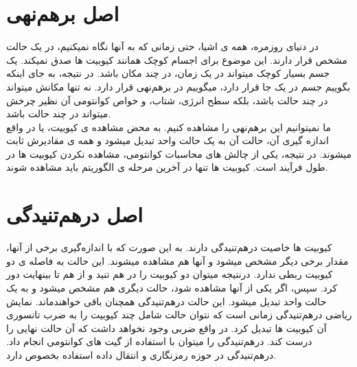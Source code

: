 \section{اصل برهم‌نهی}
در دنیای روزمره، همه ی اشیا، حتی زمانی که به آنها نگاه نمیکنیم، در یک حالت مشخص قرار دارند. این موضوع برای اجسام کوچک همانند کیوبیت ها صدق نمیکند. یک جسم بسیار کوچک میتواند در یک زمان، در چند مکان باشد. در نتیجه، به جای اینکه بگوییم جسم در یک جا قرار دارد، میگوییم در برهم‌نهی قرار دارد. نه تنها مکانش میتواند در چند حالت باشد، بلکه سطح انرژی، شتاب، و خواص کوانتومی آن نظیر چرخش
 میتواند در چند حالت باشد. 
\\
ما نمیتوانیم این برهم‌نهی را مشاهده کنیم. به محض مشاهده ی کیوبیت، یا در واقع اندازه گیری آن، حالت آن به یک حالت واحد تبدیل میشود و همه ی مقادیرش ثابت میشوند. در نتیجه، یکی از چالش های محاسبات کوانتومی، مشاهده نکردن کیوبیت ها در طول فرآیند است. کیوبیت ها تنها در آخرین مرحله ی الگوریتم باید مشاهده شوند.
\cite{cambridgebook}
\section{اصل درهم‌تنیدگی}
کیوبیت ها خاصیت درهم‌تنیدگی
دارند. به این صورت که با اندازه‌گیری برخی از آنها، مقدار برخی دیگر مشخص میشود و آنها هم مشاهده میشوند. این حالت به فاصله ی دو کیوبیت ربطی ندارد. درنتیجه میتوان دو کیوبیت را در هم تنید و از هم تا بینهایت دور کرد. سپس، اگر یکی از آنها مشاهده شود، حالت دیگری هم مشخص میشود و به یک حالت واحد تبدیل میشود. این حالت درهم‌تنیدگی همچنان باقی خواهندماند. نمایش ریاضی درهم‌تنیدگی زمانی است که نتوان حالت شامل چند کیوبیت را به ضرب تانسوری آن کیوبیت ها تبدیل کرد. در واقع ضربی وجود نخواهد داشت که آن حالت نهایی را درست کند. درهم‌تنیدگی را میتوان با استفاده از گیت های کوانتومی انجام داد. درهم‌تنیدگی در حوزه رمزنگاری و انتقال داده استفاده بخصوص دارد.
\cite{cambridgebook}
